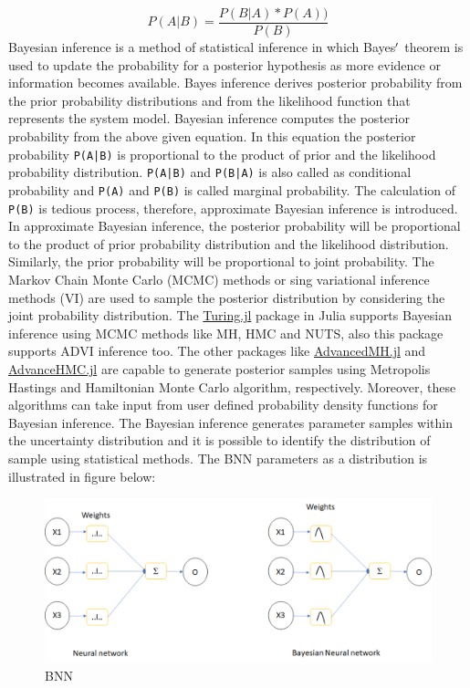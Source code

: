 \documentclass[12pt,a4paper]{article}
\begin{document}
\[
P(A|B) = \frac{P(B|A)*P(A))}{P(B)}
\]
Bayesian inference is a method of statistical inference in which Bayes\ensuremath{\rq} theorem is used to update the probability for a posterior hypothesis as more evidence or information becomes available. Bayes inference derives posterior probability from the prior probability distributions and  from the  likelihood function that represents the system model. Bayesian inference computes the posterior probability  from the above given equation. In this equation the posterior probability  \texttt{P(A|B)} is proportional to the product of prior and the likelihood probability distribution. \texttt{P(A|B)} and \texttt{P(B|A)} is also called as conditional probability and \texttt{P(A)} and \texttt{P(B)} is called marginal probability. The calculation of \texttt{P(B)} is tedious process, therefore, approximate Bayesian inference is introduced. In approximate Bayesian inference, the posterior probability will be proportional to the product of prior probability distribution and the likelihood distribution. Similarly, the prior probability will be proportional to joint probability. The Markov Chain Monte Carlo (MCMC) methods or sing variational inference methods (VI) are used to sample the posterior distribution by considering the joint probability distribution.  The \href{https://github.com/TuringLang/Turing.jl}{Turing.jl} package in Julia supports Bayesian inference using MCMC methods like MH, HMC and NUTS, also this package supports ADVI inference too. The other packages like \href{https://github.com/TuringLang/AdvancedMH.jl}{AdvancedMH.jl} and \href{https://github.com/TuringLang/AdvancedHMC.jl}{AdvanceHMC.jl} are capable to generate  posterior samples using Metropolis Hastings and Hamiltonian Monte Carlo algorithm, respectively. Moreover, these algorithms can take input from user defined probability density functions for Bayesian inference. The Bayesian inference generates parameter samples within the uncertainty distribution and it is possible to identify the distribution of sample using statistical methods. The BNN parameters as a distribution is illustrated in figure below:

\begin{figure}
\centering
\includegraphics{img/bnn.png}
\caption{BNN}
\end{figure}
\end{document}
